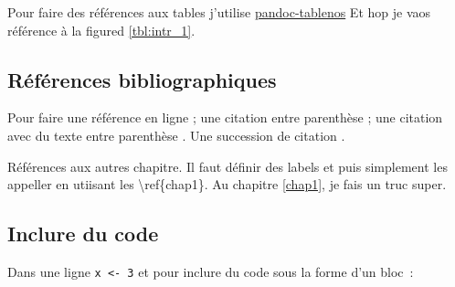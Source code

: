 Pour faire des références aux tables j'utilise
\href{https://github.com/tomduck/pandoc-tablenos}{pandoc-tablenos} Et
hop je vaos référence à la figured \ref{tbl:intr_1}.

\subsection*{Références
bibliographiques}\label{ruxe9fuxe9rences-bibliographiques}

Pour faire une référence en ligne \citet{Cazelles2016a}; une citation
entre parenthèse \citep{Cazelles2016a}; une citation avec du texte entre
parenthèse \citep[voir][]{Cazelles2016a}. Une succession de citation
\citep{Cazelles2016a, MacArthur1967, DeRuiter1995}.

Références aux autres chapitre. Il faut définir des labels et puis
simplement les appeller en utiisant les \textbackslash{}ref\{chap1\}. Au
chapitre \ref{chap1}, je fais un truc super.

\subsection*{Inclure du code}\label{inclure-du-code}

Dans une ligne \texttt{x\ \textless{}-\ 3} et pour inclure du code sous
la forme d'un bloc~:

\begin{Shaded}
\begin{Highlighting}[]
 \OperatorTok{:}\NormalTok{)\{}
\NormalTok{\}}
\end{Highlighting}
\end{Shaded}

\begin{Shaded}
\begin{Highlighting}[]
   \KeywordTok{;} 
\end{Highlighting}
\end{Shaded}

